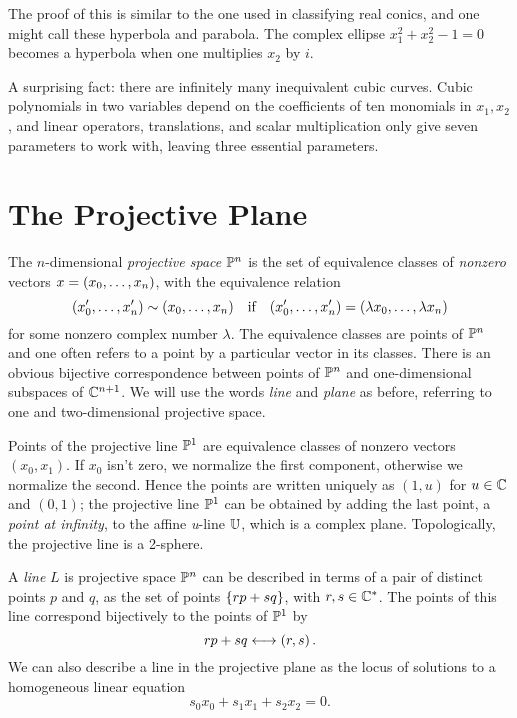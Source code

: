 \documentclass{report}
\begin{document}
The proof of this is similar to the one used in classifying real conics, and one might call these hyperbola and parabola.
The complex ellipse $x_1^2 + x_2^2 - 1 = 0$ becomes a hyperbola when one multiplies $x_2$ by $i$.

A surprising fact: there are infinitely many inequivalent cubic curves.
Cubic polynomials in two variables depend on the coefficients of ten monomials in $x_1,x_2$, and linear operators, translations, and scalar multiplication only give seven parameters to work with, leaving three essential parameters.

\section{The Projective Plane}
The $n$-dimensional \emph{projective space} $\mathbb{P}^n$ is the set of equivalence classes of \emph{nonzero} vectors $x = \left( x_0,\dots,x_n \right)$, with the equivalence relation
\[
  \left( x_0',\dots,x_n' \right) \sim \left( x_0,\dots,x_n \right) \text{\hspace{5pt} if \hspace{5pt}}
  \left( x_0',\dots,x_n' \right) = \left( \lambda x_0,\dots, \lambda x_n \right)
\]
for some nonzero complex number $\lambda$. 
The equivalence classes are points of $\mathbb{P}^n$ and one often refers to a point by a particular vector in its classes.
There is an obvious bijective correspondence between points of $\mathbb{P}^n$ and one-dimensional subspaces of $\mathbb{C}^{n+1}$.
We will use the words \emph{line} and \emph{plane} as before, referring to one and two-dimensional projective space.

Points of the projective line $\mathbb{P}^1$ are equivalence classes of nonzero vectors $(x_0,x_1)$.
If $x_0$ isn't zero, we normalize the first component, otherwise we normalize the second.
Hence the points are written uniquely as $(1,u)$ for $u \in \mathbb{C}$ and $(0,1)$;
the projective line $\mathbb{P}^1$ can be obtained by adding the last point, a \emph{point at infinity}, to the affine \emph{u}-line $\mathbb{U}$, which is a complex plane.
Topologically, the projective line is a 2-sphere.

A \emph{line} $L$ is projective space $\mathbb{P}^n$ can be described in terms of a pair of distinct points $p$ and $q$, as the set of points $\left\{ rp + sq \right\}$, with $r,s \in \mathbb{C}^*$.
The points of this line correspond bijectively to the points of $\mathbb{P}^1$ by
\[
  rp + sq \longleftrightarrow \left( r,s \right).
\]
We can also describe a line in the projective plane as the locus of solutions to a homogeneous linear equation
\[
  s_0x_0 + s_1x_1 + s_2x_2 = 0.
\]
\end{document}
